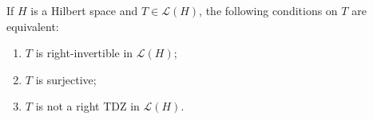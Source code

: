 If $H$ is a Hilbert space and $T \in \mathcal{L}(H)$, the following conditions on $T$ are equivalent:
\begin{enumerate}
\item[(a)] $T$ is right-invertible in $\mathcal{L}(H)$;
\item[(b)] $T$ is surjective;
\item[(c)] $T$ is not a right TDZ in $\mathcal{L}(H)$.
\end{enumerate}
